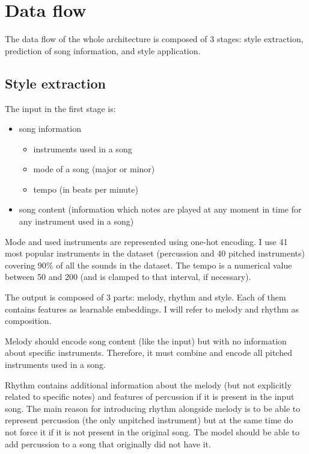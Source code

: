 \documentclass[en]{pracamgr}
\begin{document}
\chapter{Data flow}

The data flow of the whole architecture is composed of 3 stages: style extraction, prediction of song information, and style application.

\section{Style extraction}

The input in the first stage is:
\begin{itemize}
    \item song information
    \begin{itemize}
        \item instruments used in a song
        \item mode of a song (major or minor)
        \item tempo (in beats per minute)
    \end{itemize}
    \item song content (information which notes are played at any moment in time for any instrument used in a song)
\end{itemize}

Mode and used instruments are represented using one-hot encoding.
I use 41 most popular instruments in the dataset (percussion and 40 pitched instruments) covering 90\% of all the sounds in the dataset.
The tempo is a numerical value between 50 and 200 (and is clamped to that interval, if necessary).

The output is composed of 3 parts: melody, rhythm and style.
Each of them contains features as learnable embeddings.
I will refer to melody and rhythm as composition.

Melody should encode song content (like the input) but with no information about specific instruments.
Therefore, it must combine and encode all pitched instruments used in a song.

Rhythm contains additional information about the melody (but not explicitly related to specific notes) and features of percussion if it is present in the input song.
The main reason for introducing rhythm alongside melody is to be able to represent percussion (the only unpitched instrument) but at the same time do not force it if it is not present in the original song.
The model should be able to add percussion to a song that originally did not have it.
\end{document}
